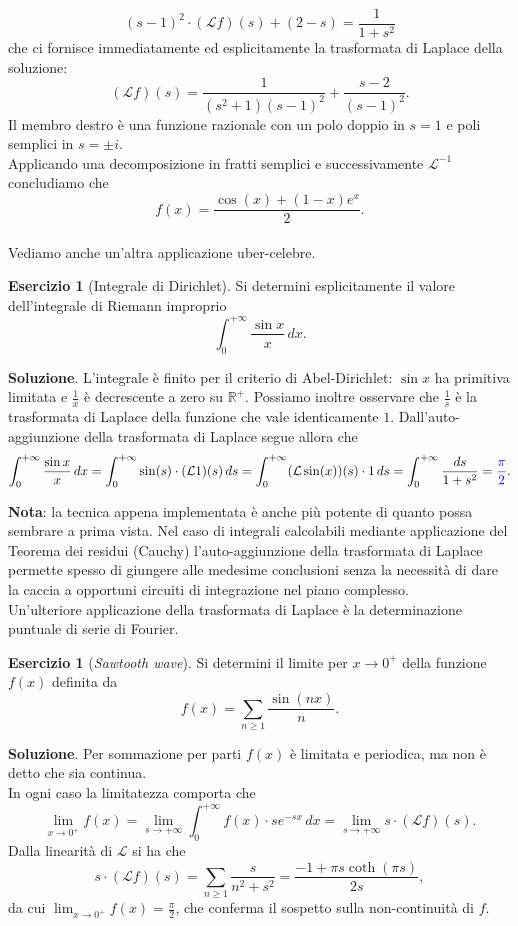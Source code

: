 \documentclass[a4paper,twoside]{article}
\newcommand{\R}{\mathbb{R}}
\theoremstyle{definition}
\newtheorem{ex}[theorem]{Esercizio}
\numberwithin{theorem}{section}
\begin{document}
$$ (s-1)^2\cdot(\mathcal{L}f)(s)+(2-s) = \frac{1}{1+s^2} $$
che ci fornisce immediatamente ed esplicitamente la trasformata di Laplace della soluzione:
$$ (\mathcal{L}f)(s) = \frac{1}{(s^2+1)(s-1)^2}+\frac{s-2}{(s-1)^2}. $$
Il membro destro è una funzione razionale con un polo doppio in $s=1$ e poli semplici in $s=\pm i$.\\ Applicando una decomposizione in fratti semplici e successivamente $\mathcal{L}^{-1}$ concludiamo che 
$$ f(x) = \frac{\cos(x)+(1-x)e^x}{2}. $$
\\
Vediamo anche un'altra applicazione uber-celebre.
\begin{ex}[Integrale di Dirichlet] Si determini esplicitamente il valore dell'integrale di Riemann improprio $$\int_{0}^{+\infty}\frac{\sin x}{x}\,dx.$$
\end{ex}
\textbf{Soluzione}. L'integrale è finito per il criterio di Abel-Dirichlet: $\sin x$ ha primitiva limitata e $\frac{1}{x}$ è decrescente a zero su $\R^+$. Possiamo inoltre osservare che $\frac{1}{s}$ è la trasformata di Laplace della funzione che vale identicamente $1$. Dall'auto-aggiunzione della trasformata di Laplace segue allora che 
$$ \int_{0}^{+\infty}\frac{\sin x}{x}\,dx = \int_{0}^{+\infty}\sin(s)\cdot(\mathcal{L} 1)(s)\,ds = \int_{0}^{+\infty}(\mathcal{L}\sin(x))(s)\cdot 1\,ds = \int_{0}^{+\infty}\frac{ds}{1+s^2}={\color{blue}\frac{\pi}{2}}. $$

\textbf{Nota}: la tecnica appena implementata è anche più potente di quanto possa sembrare a prima vista. Nel caso di integrali calcolabili mediante applicazione del Teorema dei residui (Cauchy) l'auto-aggiunzione della trasformata di Laplace permette spesso di giungere alle medesime conclusioni senza la necessità di dare la caccia a opportuni circuiti di integrazione nel piano complesso.\\

Un'ulteriore applicazione della trasformata di Laplace è la determinazione puntuale di serie di Fourier.
\begin{ex}[\emph{Sawtooth wave}] Si determini il limite per $x\to 0^+$ della funzione $f(x)$ definita da
$$ f(x) = \sum_{n\geq 1}\frac{\sin(nx)}{n}. $$
\end{ex}
\textbf{Soluzione}. Per sommazione per parti $f(x)$ è limitata e periodica, ma non è detto che sia continua.\\ In ogni caso la limitatezza comporta che 
$$ \lim_{x\to 0^+}f(x) = \lim_{s\to +\infty}\int_{0}^{+\infty}f(x)\cdot s e^{-sx}\,dx = \lim_{s\to +\infty} s\cdot(\mathcal{L} f)(s). $$
Dalla linearità di $\mathcal{L}$ si ha che 
$$ s\cdot(\mathcal{L}f)(s) = \sum_{n\geq 1}\frac{s}{n^2+s^2} = \frac{-1+\pi s\coth(\pi s)}{2s},$$
da cui $\lim_{x\to 0^+}f(x)=\frac{\pi}{2}$, che conferma il sospetto sulla non-continuità di $f$.
\end{document}
